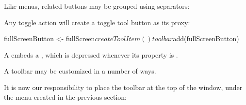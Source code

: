 Like menus, related buttons may be grouped using separators:
\begin{Schunk}
\end{Schunk}

Any toggle action will create a toggle tool button as its proxy:
\begin{Schunk}
\begin{Sinput}
 fullScreenButton <- fullScreen$createToolItem()
 toolbar$add(fullScreenButton)
\end{Sinput}
\end{Schunk}
%
A  embeds a , which
is depressed whenever its  property is .

A toolbar may be customized in a number of ways.

It is now our responsibility to place the toolbar at the top of the
window, under the menu created in the previous section:

